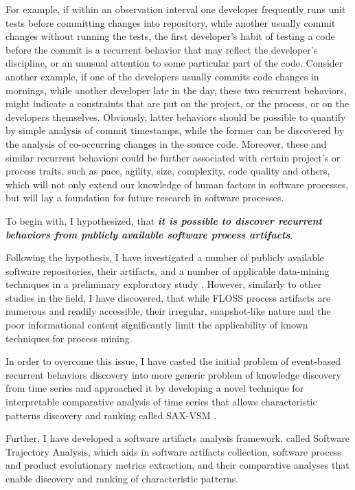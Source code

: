 For example, if within an observation interval one developer frequently runs unit tests before committing 
changes into repository, while another usually commit changes without running the tests, the first developer's
habit of testing a code before the commit is a recurrent behavior that may reflect the developer's discipline,
or an unusual attention to some particular part of the code. 
Consider another example, if one of the developers usually commits code changes in mornings, while another 
developer late in the day, these two recurrent behaviors, might indicate a constraints that are put on the 
project, or the process, or on the developers themselves.
Obviously, latter behaviors should be possible to quantify by simple analysis of commit timestamps, while 
the former can be discovered by the analysis of co-occurring changes in the source code. 
Moreover, these and similar recurrent behaviors could be further associated with certain project's or process 
traits, such as pace, agility, size, complexity, code quality and others, which will not only extend our 
knowledge of human factors in software processes, but will lay a foundation for future research in software 
processes.

To begin with, I hypothesized, that \textbf{\textit{it is possible to discover recurrent behaviors from 
publicly available software process artifacts}}. 

Following the hypothesis, I have investigated a number of publicly available software repositories,
their artifacts, and a number of applicable data-mining techniques in a preliminary exploratory study 
\cite{csdl2-10-09}. However, similarly to other studies in the field, I have discovered, that while FLOSS 
process artifacts are numerous and readily accessible, their irregular, snapshot-like nature and the poor 
informational content significantly limit the applicability of known techniques for process mining.

In order to overcome this issue, I have casted the initial problem of event-based recurrent behaviors 
discovery into more generic problem of knowledge discovery from time series and approached it
by developing a novel technique for interpretable comparative analysis of time series that allows 
characteristic patterns discovery and ranking called SAX-VSM \cite{sax-vsm}. 

Further, I have developed a software artifacts analysis framework, called Software Trajectory Analysis, 
which aids in software artifacts collection, software process and product evolutionary metrics extraction, 
and their comparative analyses that enable discovery and ranking of characteristic patterns.


